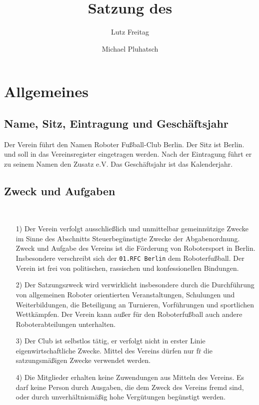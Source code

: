 \documentclass[11pt,a4paper]{scrartcl}
\author{Lutz Freitag \and Michael Pluhatsch}
\title{Satzung des \RFC}
\newcommand{\RFC}{\texttt{01.RFC Berlin}\xspace}
\begin{document}
\maketitle
\section{Allgemeines}
\subsection{Name, Sitz, Eintragung und Geschäftsjahr}\label{sec:scope}
Der Verein führt den Namen \glqq Roboter Fußball-Club Berlin\grqq.
Der Sitz ist Berlin.
 und 
soll in das Vereinsregister eingetragen werden. Nach der Eintragung f\"uhrt er zu seinem Namen den Zusatz e.V. Das Gesch\"aftsjahr ist das Kalenderjahr.

\subsection{Zweck und Aufgaben}~\label{sec:purpose}
\begin{itemize}
    \item[1)] Der  Verein  verfolgt  ausschließlich  und  unmittelbar  gemeinnützige Zwecke  im  Sinne  des Abschnitts \glqq Steuerbeg\"unstigte Zwecke\grqq{} der Abgabenordnung. Zweck und Aufgabe des Vereins ist die F\"orderung von Robotersport in Berlin. Insbesondere verschreibt sich der \RFC dem Roboterfu{\ss}ball. Der Verein ist frei von politischen, rassischen und konfessionellen Bindungen. 
    \item[2)] Der Satzungszweck wird verwirklicht insbesondere durch die Durchführung von allgemeinen Roboter orientierten Veranstaltungen, Schulungen und Weiterbildungen, die Beteiligung an Turnieren, Vorführungen und sportlichen Wettkämpfen. Der Verein kann außer für den Roboterfu{\ss}ball auch andere Roboterabteilungen unterhalten. 
 	\item[3)] Der Club ist selbstlos t\"atig, er verfolgt nicht in erster Linie eigenwirtschaftliche Zwecke. Mittel des Vereins d\"urfen nur f\"r die satzungsmäßigen Zwecke verwendet werden.
 	\item[4)] Die Mitglieder  erhalten  keine  Zuwendungen  aus  Mitteln  des  Vereins.  Es  darf  keine  Person durch Ausgaben, die dem Zweck des Vereins fremd sind, oder durch unverh\"altnismäßig hohe Vergütungen beg\"unstigt werden.
\end{itemize}
\end{document}
